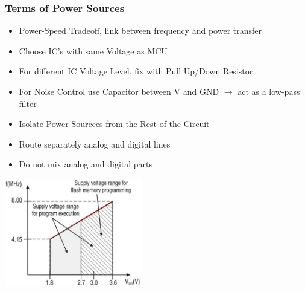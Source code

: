 \subsubsection{Terms of Power Sources}
\begin{minipage}{13cm}
	\begin{itemize}
		\item Power-Speed Tradeoff, link between frequency and power transfer
		\item Choose \acs{IC}'s with same Voltage as \acs{MCU}
		\item For different IC Voltage Level, fix with Pull Up/Down Resistor
		\item For Noise Control use Capacitor between V and \acs{GND}
        \subitem  $ \rightarrow $ act as a low-pass filter
		\item Isolate Power Sourcees from the Rest of the Circuit
		\item Route separately analog and digital lines 
		\item Do not mix analog and digital parts
	\end{itemize}
\end{minipage}
\begin{minipage}{5cm}
    \includegraphics[width=6cm]{images/PSTradeoff}
\end{minipage}


